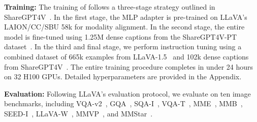 \textbf{Training:} The training of \method{} follows a three-stage strategy outlined in ShareGPT4V~\citep{chen2023sharegpt4v}.
In the first stage, the MLP adapter is pre-trained on LLaVA's LAION/CC/SBU\citep{llava,schuhmann2022laion,sharma2018conceptual,ordonez2011im2text} 58k for modality alignment.
In the second stage, the entire model is fine-tuned using 1.25M dense captions from the ShareGPT4V-PT dataset~\citep{chen2023sharegpt4v}.
In the third and final stage, we perform instruction tuning using a combined dataset of 665k examples from LLaVA-1.5~\citep{llava} and 102k dense captions from ShareGPT4V~\citep{chen2023sharegpt4v}.
The entire training procedure completes in under 24 hours on 32 H100 GPUs.
Detailed hyperparameters are provided in the Appendix.


\textbf{Evaluation:} Following LLaVA's evaluation protocol, we evaluate \method{} on ten image benchmarks, including VQA-v2~\citep{goyal2017making}, GQA~\citep{hudson2019gqa}, SQA-I~\citep{lu2022learn}, VQA-T~\citep{mao2016generation}, MME~\citep{fu2024mmecomprehensiveevaluationbenchmark}, MMB~\citep{liu2023mmbench}, SEED-I~\citep{li2023seed}, LLaVA-W~\citep{llava}, MMVP~\citep{tong2024eyes}, and MMStar~\citep{chen2024we}.


